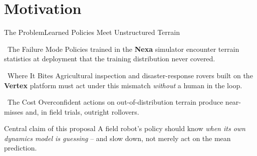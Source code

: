 \section{Motivation}

\begin{frame}{The Problem}{Learned Policies Meet Unstructured Terrain}
  \begin{minipage}[t]{0.32\textwidth}
    \begin{navybox}{\faExclamationTriangle\ The Failure Mode}
      \footnotesize
      Policies trained in the \textbf{Nexa} simulator encounter terrain
      statistics at deployment that the training distribution never covered.
    \end{navybox}
  \end{minipage}\hfill
  \begin{minipage}[t]{0.32\textwidth}
    \begin{navybox}{\faRobot\ Where It Bites}
      \footnotesize
      Agricultural inspection and disaster-response rovers built on the
      \textbf{Vertex} platform must act under this mismatch \emph{without}
      a human in the loop.
    \end{navybox}
  \end{minipage}\hfill
  \begin{minipage}[t]{0.32\textwidth}
    \begin{navybox}{\faChartLine\ The Cost}
      \footnotesize
      Overconfident actions on out-of-distribution terrain produce
      near-misses and, in field trials, outright rollovers.
    \end{navybox}
  \end{minipage}
  \par\vspace{10pt}

  \begin{block}{Central claim of this proposal}
    A field robot's policy should know \emph{when its own dynamics model is
    guessing} -- and slow down, not merely act on the mean prediction.
  \end{block}
\end{frame}


